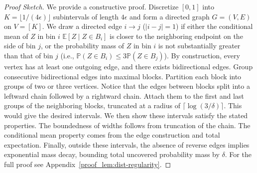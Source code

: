 \documentclass[11pt]{article}
\theoremstyle{statplain}
\theoremstyle{statdefinition}
\newcommand{\E}{\mathbb{E}}
\newcommand{\PP}{\mathbb{P}}
\newcommand{\0}{\mathbf{0}}
\begin{document}



\begin{proof}[Proof Sketch]
We provide a constructive proof. Discretize $[0,1]$ into $K = \lfloor1/(4\epsilon)\rfloor$ subintervals of length $4\epsilon$ and form a directed graph $G=(V,E)$ on $V = [K]$. We draw a directed edge $i \to j$ ($|i-j|=1$) if either the conditional mean of $Z$ in bin $i$ $\E[Z \mid Z \in B_i]$ is closer to the neighboring endpoint on the side of bin $j$, or the probability mass of $Z$ in bin $i$ is not substantially greater than that of bin $j$ (i.e., $\PP(Z\in B_i)\le 3\PP(Z\in B_j)$). By construction, every vertex has at least one outgoing edge, and there exists  bidirectional edges. 
Group consecutive bidirectional edges into maximal blocks. Partition each block into groups of two or three vertices. Notice that the edges between blocks split into a leftward chain followed by a rightward chain. Attach them to the first and last groups of the neighboring blocks, truncated at a radius of $\lceil\log(3/\delta)\rceil$. This would give the desired intervals.
We then show these intervals satisfy the stated properties. 
The boundedness of widths follows from truncation of the chain. 
The conditional mean property comes from the edge construction and total expectation. Finally, outside these intervals, the absence of reverse edges implies exponential mass decay, bounding total uncovered probability mass by $\delta$. For the full proof see
Appendix~\ref{proof_lem:dist-regularity}.
\end{proof}
\end{document}
